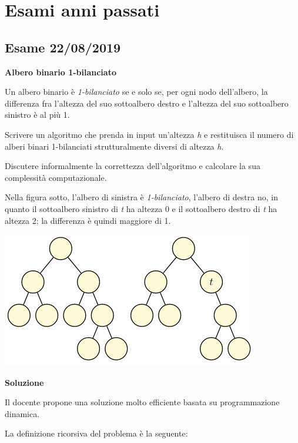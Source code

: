 \documentclass[../cheatSheetAlgoritmi.tex]{subfiles}
\begin{document}
\section{Esami anni passati}
\subsection{Esame 22/08/2019}
\textbf{Albero binario 1-bilanciato} 

Un albero binario è \emph{1-bilanciato} se e solo se, per ogni nodo dell'albero, la differenza fra l'altezza del suo sottoalbero destro e l'altezza del suo sottoalbero sinistro è al più 1. 

Scrivere un algoritmo che prenda in input un'altezza \emph{h} e restituisca il numero di alberi binari 1-bilanciati strutturalmente diversi di altezza \emph{h}. 

Discutere informalmente la correttezza dell'algoritmo e calcolare la sua complessità computazionale. 

Nella figura sotto, l'albero di sinistra è \emph{1-bilanciato}, l'albero di destra no, in quanto il sottoalbero sinistro di \emph{t} ha altezza 0 e il sottoalbero destro di \emph{t} ha altezza 2; la differenza è quindi maggiore di 1.
\begin{center}
	\includegraphics{../img/esame_22082019}
\end{center}
\textbf{Soluzione}  

Il docente propone una soluzione molto efficiente basata su programmazione dinamica. 

La definizione ricorsiva del problema è la seguente: 
\end{document}
